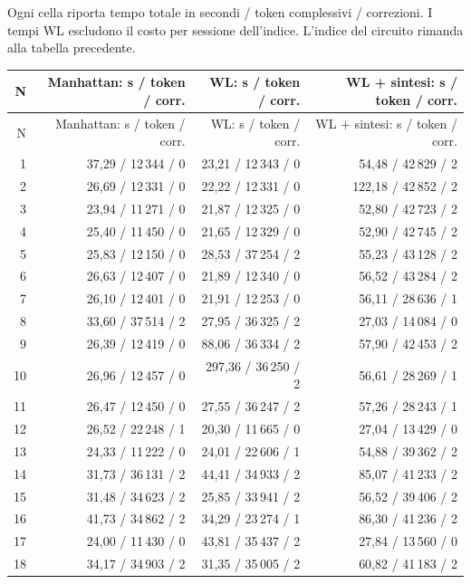 \documentclass[a4paper,10pt]{article}
\begin{document}
Ogni cella riporta tempo totale in secondi / token complessivi / correzioni. I tempi WL escludono il costo per sessione dell'indice. L'indice del circuito rimanda alla tabella precedente.\par\begingroup\small\renewcommand{\arraystretch}{1.1}\setlength{\tabcolsep}{6pt}\begin{longtable}{r r r r}\toprule N & Manhattan: s / token / corr. & WL: s / token / corr. & WL + sintesi: s / token / corr.\\\midrule\endfirsthead\toprule N & Manhattan: s / token / corr. & WL: s / token / corr. & WL + sintesi: s / token / corr.\\\midrule\endhead1 & 37,29 / 12\,344 / 0 & 23,21 / 12\,343 / 0 & 54,48 / 42\,829 / 2\\ 
2 & 26,69 / 12\,331 / 0 & 22,22 / 12\,331 / 0 & 122,18 / 42\,852 / 2\\ 
3 & 23,94 / 11\,271 / 0 & 21,87 / 12\,325 / 0 & 52,80 / 42\,723 / 2\\ 
4 & 25,40 / 11\,450 / 0 & 21,65 / 12\,329 / 0 & 52,90 / 42\,745 / 2\\ 
5 & 25,83 / 12\,150 / 0 & 28,53 / 37\,254 / 2 & 55,23 / 43\,128 / 2\\ 
6 & 26,63 / 12\,407 / 0 & 21,89 / 12\,340 / 0 & 56,52 / 43\,284 / 2\\ 
7 & 26,10 / 12\,401 / 0 & 21,91 / 12\,253 / 0 & 56,11 / 28\,636 / 1\\ 
8 & 33,60 / 37\,514 / 2 & 27,95 / 36\,325 / 2 & 27,03 / 14\,084 / 0\\ 
9 & 26,39 / 12\,419 / 0 & 88,06 / 36\,334 / 2 & 57,90 / 42\,453 / 2\\ 
10 & 26,96 / 12\,457 / 0 & 297,36 / 36\,250 / 2 & 56,61 / 28\,269 / 1\\ 
11 & 26,47 / 12\,450 / 0 & 27,55 / 36\,247 / 2 & 57,26 / 28\,243 / 1\\ 
12 & 26,52 / 22\,248 / 1 & 20,30 / 11\,665 / 0 & 27,04 / 13\,429 / 0\\ 
13 & 24,33 / 11\,222 / 0 & 24,01 / 22\,606 / 1 & 54,88 / 39\,362 / 2\\ 
14 & 31,73 / 36\,131 / 2 & 44,41 / 34\,933 / 2 & 85,07 / 41\,233 / 2\\ 
15 & 31,48 / 34\,623 / 2 & 25,85 / 33\,941 / 2 & 56,52 / 39\,406 / 2\\ 
16 & 41,73 / 34\,862 / 2 & 34,29 / 23\,274 / 1 & 86,30 / 41\,236 / 2\\ 
17 & 24,00 / 11\,430 / 0 & 43,81 / 35\,437 / 2 & 27,84 / 13\,560 / 0\\ 
18 & 34,17 / 34\,903 / 2 & 31,35 / 35\,005 / 2 & 60,82 / 41\,183 / 2\\ 

\end{longtable}
\end{document}

